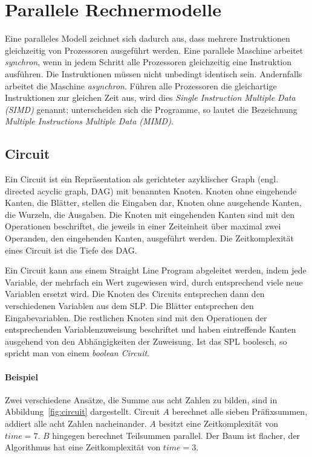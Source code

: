 \section{Parallele Rechnermodelle}
Eine paralleles Modell zeichnet sich dadurch aus, dass mehrere Instruktionen
gleichzeitig von Prozessoren ausgeführt werden.
Eine parallele Maschine arbeitet \emph{synchron}, wenn in jedem Schritt alle
Prozessoren gleichzeitig eine Instruktion ausführen.
Die Instruktionen müssen nicht unbedingt identisch sein.
Andernfalls arbeitet die Maschine \emph{asynchron}.
Führen alle Prozessoren die gleichartige Instruktionen zur gleichen Zeit aus,
wird dies \emph{Single Instruction Multiple Data (SIMD)} genannt; unterscheiden
sich die Programme, so lautet die Bezeichnung
\emph{Multiple Instructions Multiple Data (MIMD)}.

\subsection{Circuit}
Ein Circuit ist ein Repräsentation als gerichteter azyklischer Graph
(engl. directed acyclic graph, DAG) mit benannten Knoten.
Knoten ohne eingehende Kanten, die Blätter, stellen die Eingaben dar, Knoten
ohne ausgehende Kanten, die Wurzeln, die Ausgaben.
Die Knoten mit eingehenden Kanten sind mit den Operationen beschriftet, die
jeweils in einer Zeiteinheit über maximal zwei Operanden, den eingehenden
Kanten, ausgeführt werden.
Die Zeitkomplexität eines Circuit ist die Tiefe des DAG.

Ein Circuit kann aus einem Straight Line Program abgeleitet werden, indem jede
Variable, der mehrfach ein Wert zugewiesen wird, durch entsprechend viele neue
Variablen ersetzt wird.
Die Knoten des Circuits entsprechen dann den verschiedenen Variablen aus dem
SLP.
Die Blätter entsprechen den Eingabevariablen.
Die restlichen Knoten sind mit den Operationen der entsprechenden
Variablenzuweisung beschriftet und haben eintreffende Kanten ausgehend von den
Abhängigkeiten der Zuweisung.
Ist das SPL boolesch, so spricht man von einem \emph{boolean Circuit}.
\cite[S.7]{jaja}\cite[S.11f.]{reif}

\paragraph{Beispiel}
Zwei verschiedene Ansätze, die Summe aus acht Zahlen zu bilden, sind in
Abbildung~\ref{fig:circuit} dargestellt.
Circuit $A$ berechnet alle sieben Präfixsummen, addiert alle acht Zahlen
nacheinander.
$A$ besitzt eine Zeitkomplexität von $time = 7$.
$B$ hingegen berechnet Teilsummen parallel.
Der Baum ist flacher, der Algorithmus hat eine Zeitkomplexität von $time = 3$.

